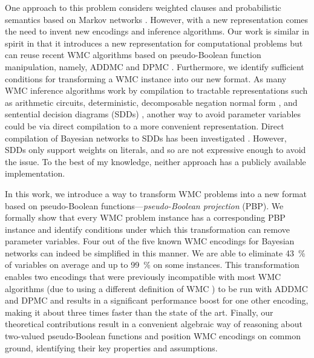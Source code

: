 One approach to this problem considers weighted clauses and probabilistic
semantics based on Markov networks \citep{DBLP:conf/uai/GogateD10}. However, with
a new representation comes the need to invent new encodings and inference
algorithms. Our work is similar in spirit in that it introduces a new
representation for computational problems but can reuse recent WMC algorithms
based on pseudo-Boolean function manipulation, namely, \textsf{ADDMC}
\citep{DBLP:conf/aaai/DudekPV20} and \textsf{DPMC} \citep{DBLP:conf/cp/DudekPV20}.
Furthermore, we identify sufficient conditions for transforming a WMC instance
into our new format. As many WMC inference algorithms
\citep{DBLP:conf/ecai/Darwiche04,DBLP:conf/ijcai/OztokD15} work by compilation to
tractable representations such as arithmetic circuits, deterministic,
decomposable negation normal form \citep{DBLP:journals/jancl/Darwiche01}, and
sentential decision diagrams (SDDs) \citep{DBLP:conf/ijcai/Darwiche11}, another
way to avoid parameter variables could be via direct compilation to a more
convenient representation. Direct compilation of Bayesian networks to SDDs has
been investigated \citep{DBLP:conf/ecsqaru/ChoiKD13}. However, SDDs only support
weights on literals, and so are not expressive enough to avoid the issue. To the
best of my knowledge, neither approach \citep{DBLP:conf/ecsqaru/ChoiKD13,DBLP:conf/uai/GogateD10} has a publicly available implementation.

In this work, we introduce a way to transform WMC problems into a new format
based on pseudo-Boolean functions---\emph{pseudo-Boolean projection} (PBP). We
formally show that every WMC problem instance has a corresponding PBP instance
and identify conditions under which this transformation can remove parameter
variables. Four out of the five known WMC encodings for Bayesian networks
\citep{DBLP:conf/ecai/BartKLM16,DBLP:conf/ijcai/ChaviraD05,DBLP:conf/sat/ChaviraD06,DBLP:conf/kr/Darwiche02,DBLP:conf/aaai/SangBK05}
can indeed be simplified in this manner. We are able to eliminate
\SI{43}{\percent} of variables on average and up to \SI{99}{\percent} on some
instances. This transformation enables two encodings that were previously
incompatible with most WMC algorithms (due to using a different definition of
WMC \citep{DBLP:conf/ijcai/ChaviraD05,DBLP:conf/sat/ChaviraD06}) to be run with
\textsf{ADDMC} and \textsf{DPMC} and results in a significant performance boost
for one other encoding, making it about three times faster than the state of the
art. Finally, our theoretical contributions result in a convenient algebraic way
of reasoning about two-valued pseudo-Boolean functions and position WMC
encodings on common ground, identifying their key properties and assumptions.

